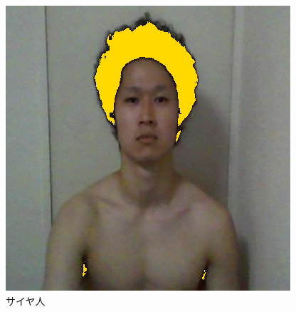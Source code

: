 \documentclass[10pt,a4paper]{jsarticle}
\begin{document}
\begin{figure}[h]
  \includegraphics[scale=1]{sutehageb2y.png}
  \caption{サイヤ人}
  \label{fig:sutehage}
  
\end{figure}

\end{document}
